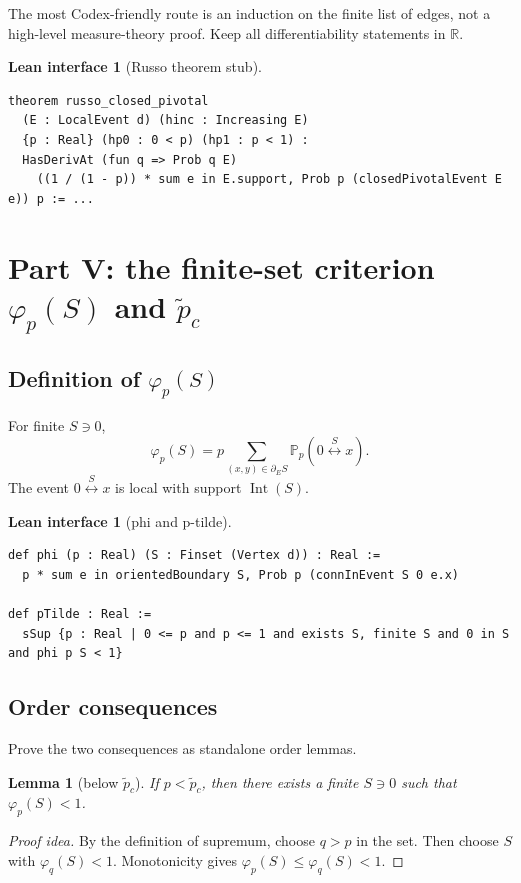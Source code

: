 \documentclass[11pt]{article}
\newcommand{\R}{\mathbb R}
\newcommand{\PP}{\mathbb P}
\newcommand{\conn}{\longleftrightarrow}
\newcommand{\ptilde}{\widetilde p_c}
\newcommand{\dE}{\partial_E}
\newcommand{\Int}{\operatorname{Int}}
\theoremstyle{definition}
\newtheorem{interface}[definition]{Lean interface}
\theoremstyle{plain}
\newtheorem{lemma}[definition]{Lemma}
\begin{document}
The most Codex-friendly route is an induction on the finite list of edges, not a high-level measure-theory proof.  Keep all differentiability statements in $\R$.

\begin{interface}[Russo theorem stub]
\begin{lstlisting}
theorem russo_closed_pivotal
  (E : LocalEvent d) (hinc : Increasing E)
  {p : Real} (hp0 : 0 < p) (hp1 : p < 1) :
  HasDerivAt (fun q => Prob q E)
    ((1 / (1 - p)) * sum e in E.support, Prob p (closedPivotalEvent E e)) p := ...
\end{lstlisting}
\end{interface}

\section{Part V: the finite-set criterion $\varphi_p(S)$ and $\ptilde$}

\subsection{Definition of $\varphi_p(S)$}

For finite $S\ni0$,
\[
  \varphi_p(S)=p\sum_{(x,y)\in\dE S}\PP_p(0\stackrel S\conn x).
\]
The event $0\stackrel S\conn x$ is local with support $\Int(S)$.

\begin{interface}[phi and p-tilde]
\begin{lstlisting}
def phi (p : Real) (S : Finset (Vertex d)) : Real :=
  p * sum e in orientedBoundary S, Prob p (connInEvent S 0 e.x)

def pTilde : Real :=
  sSup {p : Real | 0 <= p and p <= 1 and exists S, finite S and 0 in S and phi p S < 1}
\end{lstlisting}
\end{interface}

\subsection{Order consequences}

Prove the two consequences as standalone order lemmas.

\begin{lemma}[below $\ptilde$]
If $p<\ptilde$, then there exists a finite $S\ni0$ such that $\varphi_p(S)<1$.
\end{lemma}
\begin{proof}[Proof idea]
By the definition of supremum, choose $q>p$ in the set.  Then choose $S$ with $\varphi_q(S)<1$.  Monotonicity gives $\varphi_p(S)\le\varphi_q(S)<1$.
\end{proof}
\end{document}
